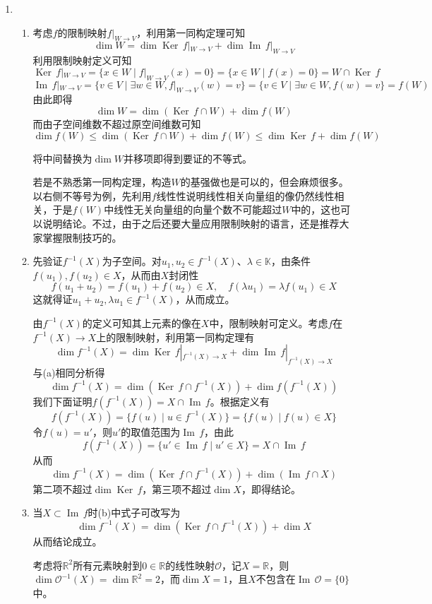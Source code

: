 \documentclass[a4paper,UTF8,fontset=windows,AutoFakeBold]{ctexart}
\DeclareMathOperator{\im}{Im\,}
\DeclareMathOperator{\Ker}{Ker\,}
\newcommand*{\mo}{\mathcal{O}}
\newcommand*{\note}{\noindent *}
\begin{document}
\begin{enumerate}
    \item
    \begin{enumerate}
        \item
        考虑$f$的限制映射$f|_{W\to V}$，利用第一同构定理可知
        $$\dim W=\dim\Ker f|_{W\to V}+\dim\im f|_{W\to V}$$
        利用限制映射定义可知
        $$\Ker f|_{W\to V}=\{x\in W\mid f|_{W\to V}(x)=0\}=\{x\in W\mid f(x)=0\}=W\cap\Ker f$$
        $$\im f|_{W\to V}=\{v\in V\mid\exists w\in W,f|_{W\to V}(w)=v\}=\{v\in V\mid\exists w\in W,f(w)=v\}=f(W)$$
        由此即得
        $$\dim W=\dim(\Ker f\cap W)+\dim f(W)$$
        而由子空间维数不超过原空间维数可知
        $$\dim f(W)\le\dim(\Ker f\cap W)+\dim f(W)\le\dim\Ker f+\dim f(W)$$

        将中间替换为$\dim W$并移项即得到要证的不等式。
    
        \note 若是不熟悉第一同构定理，构造$W$的基强做也是可以的，但会麻烦很多。以右侧不等号为例，先利用$f$线性性说明线性相关向量组的像仍然线性相关，于是$f(W)$中线性无关向量组的向量个数不可能超过$W$中的，这也可以说明结论。不过，由于之后还要大量应用限制映射的语言，还是推荐大家掌握限制技巧的。

        \item 
        先验证$f^{-1}(X)$为子空间。对$u_1,u_2\in f^{-1}(X)$、$\lambda\in\mathbb{K}$，由条件$f(u_1),f(u_2)\in X$，从而由$X$封闭性
        $$f(u_1+u_2)=f(u_1)+f(u_2)\in X,\quad f(\lambda u_1)=\lambda f(u_1)\in X$$
        这就得证$u_1+u_2,\lambda u_1\in f^{-1}(X)$，从而成立。

        由$f^{-1}(X)$的定义可知其上元素的像在$X$中，限制映射可定义。考虑$f$在$f^{-1}(X)\to X$上的限制映射，利用第一同构定理有
        $$\dim f^{-1}(X)=\dim\Ker f|_{f^{-1}(X)\to X}+\dim\im f|_{f^{-1}(X)\to X}$$
        与(a)相同分析得
        $$\dim f^{-1}(X)=\dim(\Ker f\cap f^{-1}(X))+\dim f(f^{-1}(X))$$
        我们下面证明$f(f^{-1}(X))=X\cap\im f$。根据定义有
        $$f(f^{-1}(X))=\{f(u)\mid u\in f^{-1}(X)\}=\{f(u)\mid f(u)\in X\}$$
        令$f(u)=u'$，则$u'$的取值范围为$\im f$，由此
        $$f(f^{-1}(X))=\{u'\in\im f\mid u'\in X\}=X\cap\im f$$
        从而
        $$\dim f^{-1}(X)=\dim(\Ker f\cap f^{-1}(X))+\dim(\im f\cap X)$$
        第二项不超过$\dim\Ker f$，第三项不超过$\dim X$，即得结论。

        \item
        当$X\subset\im f$时(b)中式子可改写为
        $$\dim f^{-1}(X)=\dim(\Ker f\cap f^{-1}(X))+\dim X$$
        从而结论成立。

        考虑将$\mathbb{R}^2$所有元素映射到$0\in\mathbb{R}$的线性映射$\mo$，记$X=\mathbb{R}$，则$\dim\mo^{-1}(X)=\dim\mathbb{R}^2=2$，而$\dim X=1$，且$X$不包含在$\im\mo=\{0\}$中。
        

\end{enumerate}
\end{enumerate}
\end{document}

